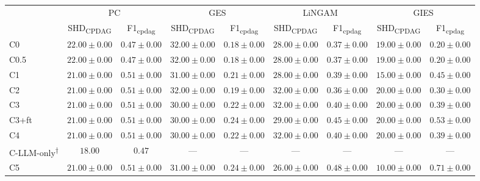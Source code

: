 \begin{tabular}{l|cc|cc|cc|cc}
\hline
 & \multicolumn{2}{c|}{PC} & \multicolumn{2}{c|}{GES} & \multicolumn{2}{c|}{LiNGAM} & \multicolumn{2}{c}{GIES} \\
 & SHD\textsubscript{CPDAG} & F1\textsubscript{cpdag} & SHD\textsubscript{CPDAG} & F1\textsubscript{cpdag} & SHD\textsubscript{CPDAG} & F1\textsubscript{cpdag} & SHD\textsubscript{CPDAG} & F1\textsubscript{cpdag} \\
\hline
C0 & $22.00 \pm 0.00$ & $0.47 \pm 0.00$ & $32.00 \pm 0.00$ & $0.18 \pm 0.00$ & $28.00 \pm 0.00$ & $0.37 \pm 0.00$ & $19.00 \pm 0.00$ & $0.20 \pm 0.00$ \\
C0.5 & $22.00 \pm 0.00$ & $0.47 \pm 0.00$ & $32.00 \pm 0.00$ & $0.18 \pm 0.00$ & $28.00 \pm 0.00$ & $0.37 \pm 0.00$ & $19.00 \pm 0.00$ & $0.20 \pm 0.00$ \\
C1 & $21.00 \pm 0.00$ & $0.51 \pm 0.00$ & $31.00 \pm 0.00$ & $0.21 \pm 0.00$ & $28.00 \pm 0.00$ & $0.39 \pm 0.00$ & $15.00 \pm 0.00$ & $0.45 \pm 0.00$ \\
C2 & $21.00 \pm 0.00$ & $0.51 \pm 0.00$ & $32.00 \pm 0.00$ & $0.19 \pm 0.00$ & $32.00 \pm 0.00$ & $0.36 \pm 0.00$ & $20.00 \pm 0.00$ & $0.30 \pm 0.00$ \\
C3 & $21.00 \pm 0.00$ & $0.51 \pm 0.00$ & $30.00 \pm 0.00$ & $0.22 \pm 0.00$ & $32.00 \pm 0.00$ & $0.40 \pm 0.00$ & $20.00 \pm 0.00$ & $0.39 \pm 0.00$ \\
C3+ft & $21.00 \pm 0.00$ & $0.51 \pm 0.00$ & $30.00 \pm 0.00$ & $0.24 \pm 0.00$ & $29.00 \pm 0.00$ & $0.45 \pm 0.00$ & $20.00 \pm 0.00$ & $0.53 \pm 0.00$ \\
C4 & $21.00 \pm 0.00$ & $0.51 \pm 0.00$ & $30.00 \pm 0.00$ & $0.22 \pm 0.00$ & $32.00 \pm 0.00$ & $0.40 \pm 0.00$ & $20.00 \pm 0.00$ & $0.39 \pm 0.00$ \\
C-LLM-only\textsuperscript{$\dagger$} & $18.00$ & $0.47$ & --- & --- & --- & --- & --- & --- \\
C5 & $21.00 \pm 0.00$ & $0.51 \pm 0.00$ & $31.00 \pm 0.00$ & $0.24 \pm 0.00$ & $26.00 \pm 0.00$ & $0.48 \pm 0.00$ & $10.00 \pm 0.00$ & $0.71 \pm 0.00$ \\
\hline
\end{tabular}
